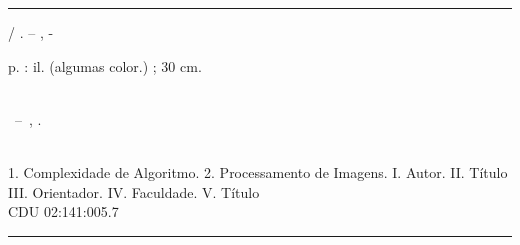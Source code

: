 \documentclass[
	12pt,				%
	openright,			%
	oneside,			%
	a4paper,			%
	chapter=TITLE,		%
	section=TITLE,		%
	english,			%
	brazil				%
	]{abntex2}
\begin{document}
\frenchspacing 


\imprimircapa

\imprimirfolhaderosto*


%
%     
\begin{fichacatalografica}
	\vspace*{\fill}					%
	\hrule							%
	\begin{center}					%
	\begin{minipage}[c]{12.5cm}		%
	
	\imprimirautor
	
	\hspace{0.5cm} \imprimirtitulo  / \imprimirautor. --
	\imprimirlocal, \imprimirdata-
	
	\hspace{0.5cm} \pageref{LastPage} p. : il. (algumas color.) ; 30 cm.\\
	
	\hspace{0.5cm} \imprimirorientadorRotulo~\imprimirorientador\\
	
	\hspace{0.5cm}
	\parbox[t]{\textwidth}{\imprimirtipotrabalho~--~\imprimirinstituicao,
	\imprimirdata.}\\
	
	\hspace{0.5cm}
		1. Complexidade de Algoritmo.
		2. Processamento de Imagens.
		I. Autor.
		II. Título
		III. Orientador.
		IV. Faculdade.
		V. Título\\ 			
	
	\hspace{8.75cm} CDU 02:141:005.7\\
	
	\end{minipage}
	\end{center}
	\hrule
\end{fichacatalografica}
\end{document}
